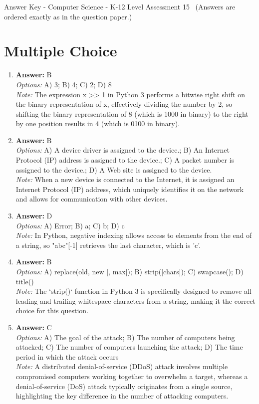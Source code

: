 \documentclass[12pt]{article}
\begin{document}
\begin{center}
Answer Key - Computer Science - K-12 Level Assessment 15 \
\small (Answers are ordered exactly as in the question paper.)
\end{center}

\section*{Multiple Choice}
\begin{enumerate}[label=\arabic*.]
\item \textbf{Answer:} B
\\ \textit{Options:} A) 3; B) 4; C) 2; D) 8
\\ \textit{Note:} The expression x \textgreater{}\textgreater{} 1 in Python 3 performs a bitwise right shift on the binary representation of x, effectively dividing the number by 2, so shifting the binary representation of 8 (which is 1000 in binary) to the right by one position results in 4 (which is 0100 in binary).
\item \textbf{Answer:} B
\\ \textit{Options:} A) A device driver is assigned to the device.; B) An Internet Protocol (IP) address is assigned to the device.; C) A packet number is assigned to the device.; D) A Web site is assigned to the device.
\\ \textit{Note:} When a new device is connected to the Internet, it is assigned an Internet Protocol (IP) address, which uniquely identifies it on the network and allows for communication with other devices.
\item \textbf{Answer:} D
\\ \textit{Options:} A) Error; B) a; C) b; D) c
\\ \textit{Note:} In Python, negative indexing allows access to elements from the end of a string, so "abc"[-1] retrieves the last character, which is 'c'.
\item \textbf{Answer:} B
\\ \textit{Options:} A) replace(old, new [, max]); B) strip([chars]); C) swapcase(); D) title()
\\ \textit{Note:} The `strip()` function in Python 3 is specifically designed to remove all leading and trailing whitespace characters from a string, making it the correct choice for this question.
\item \textbf{Answer:} C
\\ \textit{Options:} A) The goal of the attack; B) The number of computers being attacked; C) The number of computers launching the attack; D) The time period in which the attack occurs
\\ \textit{Note:} A distributed denial-of-service (DDoS) attack involves multiple compromised computers working together to overwhelm a target, whereas a denial-of-service (DoS) attack typically originates from a single source, highlighting the key difference in the number of attacking computers.
\end{enumerate}
\end{document}
